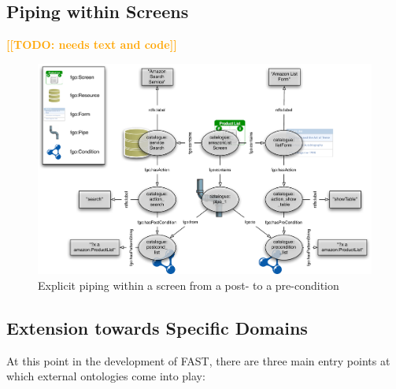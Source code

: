 \documentclass[twoside]{fast_latex}
\newcommand{\todo}[1]{\textsf{\textbf{\textcolor{Orange}{[[TODO: #1]]}}}}
\newcommand{\todo}[1]{}
\begin{document}
\subsection{Piping within Screens} %
\label{sub:piping_within_screens}

\todo{needs text and code}

\begin{figure}[ht]
  \begin{center}
    \includegraphics[width=\linewidth]{images/declarativeDefinitionExample.pdf}
    \caption{Explicit piping within a screen from a post- to a pre-condition}
    \label{fig:piping}
  \end{center}
\end{figure}



\subsection{Extension towards Specific Domains} %
\label{sub:extension_towards_specific_domains}

At this point in the development of FAST, there are three main entry points at which external ontologies come into play:
\end{document}
